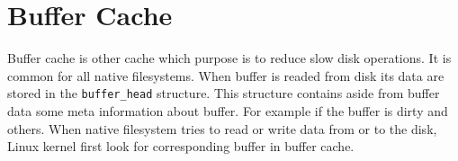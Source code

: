 \section{Buffer Cache}
Buffer cache is other cache which purpose is to reduce slow disk operations. It is
common for all native filesystems. When buffer is readed from disk its data are stored
in the \texttt{buffer\_head} structure. This structure contains aside from buffer data
some meta information about buffer. For example if the buffer is dirty and others.
When native filesystem tries to read or write  data from or to the disk, Linux
kernel first look for corresponding buffer in buffer cache. 
